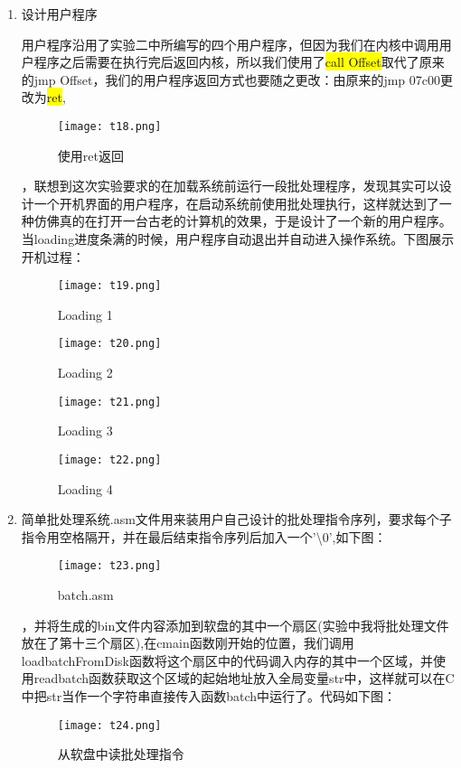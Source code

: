 \documentclass[UTF8]{article}
\begin{document}
\begin{enumerate}[1)]
\begin{enumerate}[i)]
	\end{enumerate}
	\item 设计用户程序
	{\par 用户程序沿用了实验二中所编写的四个用户程序，但因为我们在内核中调用用户程序之后需要在执行完后返回内核，所以我们使用了{\colorbox{yellow}{call Offset}}取代了原来的jmp Offset，我们的用户程序返回方式也要随之更改：由原来的jmp 07c00更改为{\colorbox{yellow}{ret}},}
	\begin{figure}[htbp]
			\centering
			\texttt{[image: t18.png]}
			\caption{使用ret返回}
		\end{figure}
	{，联想到这次实验要求的在加载系统前运行一段批处理程序，发现其实可以设计一个开机界面的用户程序，在启动系统前使用批处理执行，这样就达到了一种仿佛真的在打开一台古老的计算机的效果，于是设计了一个新的用户程序。当loading进度条满的时候，用户程序自动退出并自动进入操作系统。下图展示开机过程：}
	\begin{figure}[htbp]
			\begin{minipage}[t]{0.5\linewidth}
			\centering
			\texttt{[image: t19.png]}
			\caption{Loading 1}
			\end{minipage}
			\begin{minipage}[t]{0.5\linewidth}
				\centering
				\texttt{[image: t20.png]}
				\caption{Loading 2}
			\end{minipage}
		\end{figure}
		\begin{figure}[htbp]
			\begin{minipage}[t]{0.5\linewidth}
			\centering
			\texttt{[image: t21.png]}
			\caption{Loading 3}
			\end{minipage}
			\begin{minipage}[t]{0.5\linewidth}
				\centering
				\texttt{[image: t22.png]}
				\caption{Loading 4}
			\end{minipage}
		\end{figure}
	\newpage
	
	\item 简单批处理系统.asm文件用来装用户自己设计的批处理指令序列，要求每个子指令用空格隔开，并在最后结束指令序列后加入一个'\textbackslash0',如下图：
	\begin{figure}[htbp]
			\centering
			\texttt{[image: t23.png]}
			\caption{batch.asm}
  \end{figure}
  ，并将生成的bin文件内容添加到软盘的其中一个扇区(实验中我将批处理文件放在了第十三个扇区),在cmain函数刚开始的位置，我们调用loadbatchFromDisk函数将这个扇区中的代码调入内存的其中一个区域，并使用readbatch函数获取这个区域的起始地址放入全局变量str中，这样就可以在C中把str当作一个字符串直接传入函数batch中运行了。代码如下图：
	\begin{figure}[htbp]
			\centering
			\texttt{[image: t24.png]}
			\caption{从软盘中读批处理指令}
  \end{figure}
  

\end{enumerate}
\end{document}
